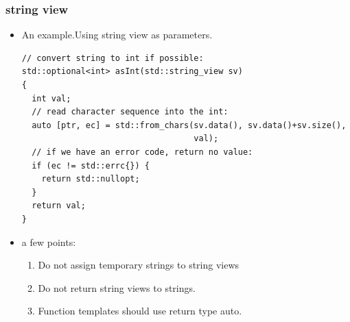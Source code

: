\documentclass[a4paper,11pt,twoside]{book}
\begin{document}
\subsubsection{string view}
\begin{itemize}
\item An example.Using string view as parameters.
\begin{lstlisting}
// convert string to int if possible:
std::optional<int> asInt(std::string_view sv)
{
  int val;
  // read character sequence into the int:
  auto [ptr, ec] = std::from_chars(sv.data(), sv.data()+sv.size(),
                                   val);
  // if we have an error code, return no value:
  if (ec != std::errc{}) {
    return std::nullopt;
  }
  return val;
}
\end{lstlisting}
\item a few points:
\begin{enumerate}
		\item Do not assign temporary strings to string views
		\item Do not return string views to strings.
		\item Function templates should use return type auto. 
\end{enumerate}
\end{itemize}
\end{document}
